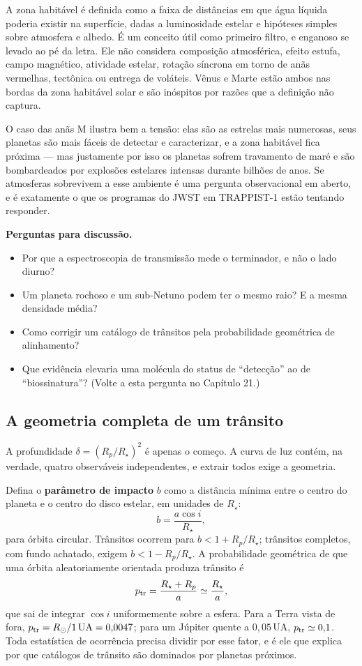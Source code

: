 \documentclass[11pt,a4paper]{article}
\begin{document}
A zona habitável é definida como a faixa de distâncias em que água líquida poderia existir na superfície, dadas a luminosidade estelar e hipóteses simples sobre atmosfera e albedo. É um conceito útil como primeiro filtro, e enganoso se levado ao pé da letra. Ele não considera composição atmosférica, efeito estufa, campo magnético, atividade estelar, rotação síncrona em torno de anãs vermelhas, tectônica ou entrega de voláteis. Vênus e Marte estão ambos nas bordas da zona habitável solar e são inóspitos por razões que a definição não captura.

O caso das anãs M ilustra bem a tensão: elas são as estrelas mais numerosas, seus planetas são mais fáceis de detectar e caracterizar, e a zona habitável fica próxima --- mas justamente por isso os planetas sofrem travamento de maré e são bombardeados por explosões estelares intensas durante bilhões de anos. Se atmosferas sobrevivem a esse ambiente é uma pergunta observacional em aberto, e é exatamente o que os programas do JWST em TRAPPIST-1 estão tentando responder.

\textbf{Perguntas para discussão.}
\begin{itemize}
\item Por que a espectroscopia de transmissão mede o terminador, e não o lado diurno?
\item Um planeta rochoso e um sub-Netuno podem ter o mesmo raio? E a mesma densidade média?
\item Como corrigir um catálogo de trânsitos pela probabilidade geométrica de alinhamento?
\item Que evidência elevaria uma molécula do status de ``detecção'' ao de ``biossinatura''? (Volte a esta pergunta no Capítulo 21.)
\end{itemize}

\subsection*{A geometria completa de um trânsito}

A profundidade $\delta=(R_p/R_\star)^{2}$ é apenas o começo. A curva de luz contém, na verdade, quatro observáveis independentes, e extrair todos exige a geometria.

Defina o \textbf{parâmetro de impacto} $b$ como a distância mínima entre o centro do planeta e o centro do disco estelar, em unidades de $R_\star$:
\[
b=\frac{a\cos i}{R_\star},
\]
para órbita circular. Trânsitos ocorrem para $b<1+R_p/R_\star$; trânsitos completos, com fundo achatado, exigem $b<1-R_p/R_\star$. A probabilidade geométrica de que uma órbita aleatoriamente orientada produza trânsito é
\[
p_{\rm tr}=\frac{R_\star+R_p}{a}\simeq\frac{R_\star}{a},
\]
que sai de integrar $\cos i$ uniformemente sobre a esfera. Para a Terra vista de fora, $p_{\rm tr}=R_\odot/1\,\mathrm{UA}=0{,}0047$; para um Júpiter quente a $0{,}05\,\mathrm{UA}$, $p_{\rm tr}\simeq0{,}1$. Toda estatística de ocorrência precisa dividir por esse fator, e é ele que explica por que catálogos de trânsito são dominados por planetas próximos.
\end{document}
